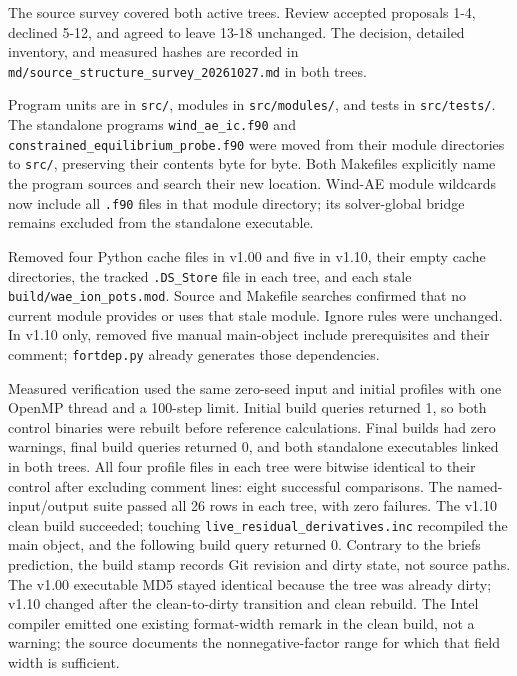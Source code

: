 \documentclass[english,a4paper]{my_memo}
\begin{document}
The source survey covered both active trees. Review accepted proposals 1-4, declined 5-12, and agreed to leave 13-18 unchanged. The decision, detailed inventory, and measured hashes are recorded in \texttt{md/source\_structure\_survey\_20261027.md} in both trees.

Program units are in \texttt{src/}, modules in \texttt{src/modules/}, and tests in \texttt{src/tests/}. The standalone programs \texttt{wind\_ae\_ic.f90} and \texttt{constrained\_equilibrium\_probe.f90} were moved from their module directories to \texttt{src/}, preserving their contents byte for byte. Both Makefiles explicitly name the program sources and search their new location. Wind-AE module wildcards now include all \texttt{.f90} files in that module directory; its solver-global bridge remains excluded from the standalone executable.

Removed four Python cache files in v1.00 and five in v1.10, their empty cache directories, the tracked \texttt{.DS\_Store} file in each tree, and each stale \texttt{build/wae\_ion\_pots.mod}. Source and Makefile searches confirmed that no current module provides or uses that stale module. Ignore rules were unchanged. In v1.10 only, removed five manual main-object include prerequisites and their comment; \texttt{fortdep.py} already generates those dependencies.

Measured verification used the same zero-seed input and initial profiles with one OpenMP thread and a 100-step limit. Initial build queries returned 1, so both control binaries were rebuilt before reference calculations. Final builds had zero warnings, final build queries returned 0, and both standalone executables linked in both trees. All four profile files in each tree were bitwise identical to their control after excluding comment lines: eight successful comparisons. The named-input/output suite passed all 26 rows in each tree, with zero failures. The v1.10 clean build succeeded; touching \texttt{live\_residual\_derivatives.inc} recompiled the main object, and the following build query returned 0. Contrary to the brief\textquotesingle s prediction, the build stamp records Git revision and dirty state, not source paths. The v1.00 executable MD5 stayed identical because the tree was already dirty; v1.10 changed after the clean-to-dirty transition and clean rebuild. The Intel compiler emitted one existing format-width remark in the clean build, not a warning; the source documents the nonnegative-factor range for which that field width is sufficient.
\end{document}
